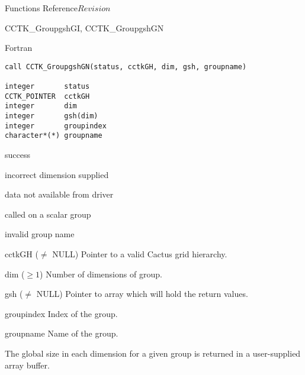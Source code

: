 \begin{cactuspart}{ Functions Reference}{}{$Revision$}
\begin{FunctionDescription}{CCTK\_GroupgshGI, CCTK\_GroupgshGN}
\begin{SynopsisSection}
\begin{Synopsis}{Fortran}
\begin{verbatim}
call CCTK_GroupgshGN(status, cctkGH, dim, gsh, groupname)

integer       status
CCTK_POINTER  cctkGH
integer       dim
integer       gsh(dim)
integer       groupindex
character*(*) groupname
\end{verbatim}
\end{Synopsis}
\end{SynopsisSection}

\begin{ResultSection}
\begin{Result}{0} success \end{Result}
\begin{Result}{-1} incorrect dimension supplied \end{Result}
\begin{Result}{-2} data not available from driver \end{Result}
\begin{Result}{-3} called on a scalar group \end{Result}
\begin{Result}{-4} invalid group name \end{Result}
\end{ResultSection}

\begin{ParameterSection}
\begin{Parameter}{cctkGH ($\ne$ NULL)} Pointer to a valid Cactus grid hierarchy. \end{Parameter}
\begin{Parameter}{dim ($\ge 1$)} Number of dimensions of group. \end{Parameter}
\begin{Parameter}{gsh ($\ne$ NULL)} Pointer to array which will hold the return values. \end{Parameter}
\begin{Parameter}{groupindex} Index of the group. \end{Parameter}
\begin{Parameter}{groupname} Name of the group. \end{Parameter}
\end{ParameterSection}

\begin{Discussion}
The global size in each dimension for a given group is returned in a user-supplied array buffer.
\end{Discussion}


\end{FunctionDescription}
\end{cactuspart}

